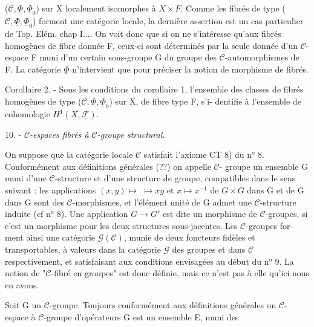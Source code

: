

($\mathcal{C}, \underline{\Phi}, \underline{\Phi}_0$) sur X localement isomorphes à $X \times F$. Comme les fibrés de
type ($\mathcal{C}, \underline{\Phi}, \underline{\Phi}_0$) forment une catégorie locale, la dernière assertion
est un cas particulier de Top. Elém. chap I.... On voit donc que si
on ne s'intéresse qu'aux fibrés homogènes de fibre donnée F, ceux-ci
sont déterminés par la seule donnée d'un $\mathcal{C}$-espace F muni d'un
certain sous-groupe G du groupe des $\mathcal{C}$-automorphismes de F. La
catégorie $\underline{\Phi}$ n'intervient que pour préciser la notion de morphisme
de fibrés.

Corollaire 2. - Sous les conditions du corollaire 1, l'ensemble des classes
de fibrés homogènes de type ($\mathcal{C}, \underline{\Phi}, \underline{\Phi}_0$) sur X, de fibre type F, s'i-
dentifie à l'ensemble de cohomologie $H^1(X, \underline{\mathcal{F}})$.

10. - \emph{$\mathcal{C}$-espaces fibrés à $\mathcal{C}$-groupe structural.}

On suppose que la catégorie locale $\mathcal{C}$ satisfait l'axiome CT 8) du
n° 8. Conformément aux définitions générales (??) on appelle $\mathcal{C}$-
groupe un ensemble G muni d'une $\mathcal{C}$-structure et d'une structure
de groupe, compatibles dans le sens suivant : les applications $(x,y) \mapsto$
$\mapsto xy$ et $x \mapsto x^{-1}$ de $G \times G$ dans G et de G dans G sont des $\mathcal{C}$-morphismes,
et l'élément unité de G admet une $\mathcal{C}$-structure induite (cf n° 8). Une
application $G \to G'$ est dite un morphisme de $\mathcal{C}$-groupes, si c'est un
morphisme pour les deux structures sous-jacentes. Les $\mathcal{C}$-groupes for-
ment ainsi une catégorie $\mathcal{G}(\mathcal{C})$, munie de deux foncteurs fidèles et
transportables, à valeurs dans la catégorie $\mathcal{G}$ des groupes et dans $\mathcal{C}$
respectivement, et satisfaisant aux conditions envisagées au début du
n° 9. La notion de "$\mathcal{C}$-fibré en groupes" est donc définie, mais ce
n'est pas à elle qu'ici nous en avons.

Soit G un $\mathcal{C}$-groupe. Toujours conformément aux définitions générales
un $\mathcal{C}$-espace à $\mathcal{C}$-groupe d'opérateurs G est un ensemble E, muni des

\newpage



